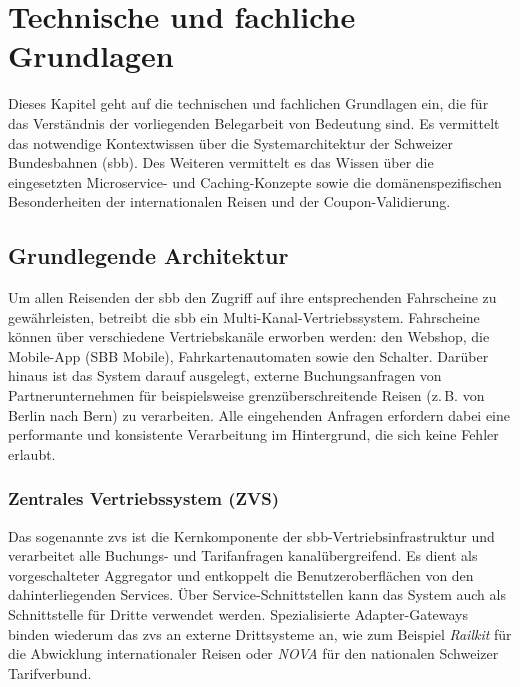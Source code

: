 \section{Technische und fachliche Grundlagen}
\label{sec:grundlagen}

Dieses Kapitel geht auf die technischen und fachlichen Grundlagen ein, die für das Verständnis der vorliegenden Belegarbeit von Bedeutung sind. Es vermittelt das notwendige Kontextwissen über die Systemarchitektur der Schweizer Bundesbahnen (\ac{sbb}). Des Weiteren vermittelt es das Wissen über die eingesetzten Microservice- und Caching-Konzepte sowie die domänenspezifischen Besonderheiten der internationalen Reisen und der Coupon-Validierung.

\subsection{Grundlegende Architektur}
\label{subsec:architektur}

Um allen Reisenden der \ac{sbb} den Zugriff auf ihre entsprechenden Fahrscheine zu gewährleisten, betreibt die \ac{sbb} ein Multi-Kanal-Vertriebssystem. Fahrscheine können über verschiedene Vertriebskanäle erworben werden: den Webshop, die Mobile-App (SBB Mobile), Fahrkartenautomaten sowie den Schalter. Darüber hinaus ist das System darauf ausgelegt, externe Buchungsanfragen von Partnerunternehmen für beispielsweise grenzüberschreitende Reisen (z.\,B. von Berlin nach Bern) zu verarbeiten. Alle eingehenden Anfragen erfordern dabei eine performante und konsistente Verarbeitung im Hintergrund, die sich keine Fehler erlaubt.


\subsubsection{Zentrales Vertriebssystem (ZVS)}

Das sogenannte \ac{zvs} ist die Kernkomponente der \ac{sbb}-Vertriebsinfrastruktur und verarbeitet alle Buchungs- und Tarifanfragen kanalübergreifend. Es dient als vorgeschalteter Aggregator und entkoppelt die Benutzeroberflächen von den dahinterliegenden Services. Über Service-Schnittstellen kann das System auch als Schnittstelle für Dritte verwendet werden. Spezialisierte Adapter-Gateways binden wiederum das \ac{zvs} an externe Drittsysteme an, wie zum Beispiel \textit{Railkit} für die Abwicklung internationaler Reisen oder \textit{NOVA} für den nationalen Schweizer Tarifverbund. %

